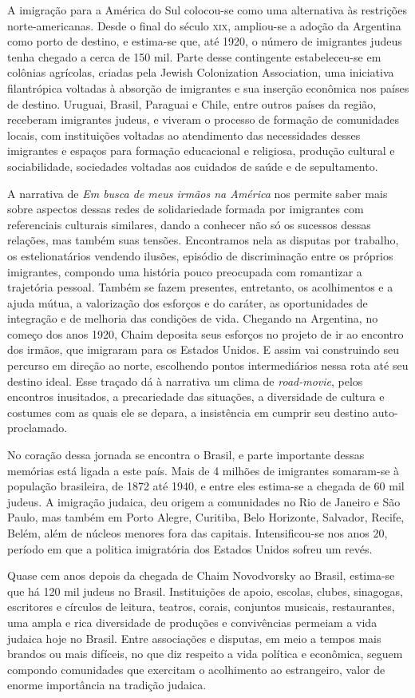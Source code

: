 A imigração para a América do Sul colocou-se como uma alternativa às
restrições norte-americanas. Desde o final do século \textsc{xix}, ampliou-se a
adoção da Argentina como porto de destino, e estima-se que, até 1920, o
número de imigrantes judeus tenha chegado a cerca de 150 mil. Parte
desse contingente estabeleceu-se em colônias agrícolas, criadas pela
Jewish Colonization Association, uma iniciativa filantrópica voltadas à
absorção de imigrantes e sua inserção econômica nos países de destino.
Uruguai, Brasil, Paraguai e Chile, entre outros países da região,
receberam imigrantes judeus, e viveram o processo de formação de
comunidades locais, com instituições voltadas ao atendimento das
necessidades desses imigrantes e espaços para formação educacional e
religiosa, produção cultural e sociabilidade, sociedades voltadas aos
cuidados de saúde e de sepultamento.

A narrativa de \textit{Em busca de meus irmãos na América} nos permite 
saber mais sobre aspectos dessas redes
de solidariedade formada por imigrantes com referenciais culturais
similares, dando a conhecer não só os sucessos dessas relações, mas
também suas tensões. Encontramos nela as disputas por trabalho, os
estelionatários vendendo ilusões, episódio de discriminação entre os
próprios imigrantes, compondo uma história pouco preocupada com
romantizar a trajetória pessoal. Também se fazem presentes, entretanto,
os acolhimentos e a ajuda mútua, a valorização dos esforços e do
caráter, as oportunidades de integração e de melhoria das condições de
vida. Chegando na Argentina, no começo dos anos 1920, Chaim deposita
seus esforços no projeto de ir ao encontro dos irmãos, que imigraram
para os Estados Unidos. E assim vai construindo seu percurso em direção
ao norte, escolhendo pontos intermediários nessa rota até seu destino
ideal. Esse traçado dá à narrativa um clima de \textit{road-movie}, pelos
encontros inusitados, a precariedade das situações, a diversidade de
cultura e costumes com as quais ele se depara, a insistência em cumprir
seu destino auto-proclamado.

No coração dessa jornada se encontra o Brasil, e parte importante dessas
memórias está ligada a este país. Mais de 4 milhões de imigrantes
somaram-se à população brasileira, de 1872 até 1940, e entre eles
estima-se a chegada de 60 mil judeus. A imigração judaica, deu origem a
comunidades no Rio de Janeiro e São Paulo, mas também em Porto Alegre,
Curitiba, Belo Horizonte, Salvador, Recife, Belém, além de núcleos
menores fora das capitais. Intensificou-se nos anos 20, período em que a
politica imigratória dos Estados Unidos sofreu um revés.

Quase cem anos depois da chegada de Chaim Novodvorsky ao Brasil,
estima-se que há 120 mil judeus no Brasil. Instituições de apoio,
escolas, clubes, sinagogas, escritores e círculos de leitura, teatros,
corais, conjuntos musicais, restaurantes, uma ampla e rica diversidade
de produções e convivências permeiam a vida judaica hoje no Brasil.
Entre associações e disputas, em meio a tempos mais brandos ou mais
difíceis, no que diz respeito a vida política e econômica, seguem
compondo comunidades que exercitam o acolhimento ao estrangeiro, valor
de enorme importância na tradição judaica.

